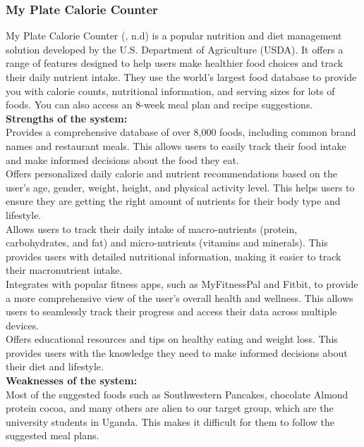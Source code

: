 \documentclass {article}
\begin{document}
\subsubsection{My Plate Calorie Counter}

\noindent My Plate Calorie Counter (, n.d) is a popular nutrition and diet management solution developed by the U.S. Department of Agriculture (USDA). It offers a range of features designed to help users make healthier food choices and track their daily nutrient intake. They use the world’s largest food database to provide you with calorie counts, nutritional information, and serving sizes for lots of foods. You can also access an 8-week meal plan and recipe suggestions.\\

\noindent \textbf{Strengths of the system:\\}
\noindent Provides a comprehensive database of over 8,000 foods, including common brand names and restaurant meals. This allows users to easily track their food intake and make informed decisions about the food they eat.\\

\noindent Offers personalized daily calorie and nutrient recommendations based on the user’s age, gender, weight, height, and physical activity level. This helps users to ensure they are getting the right amount of nutrients for their body type and lifestyle.\\

\noindent Allows users to track their daily intake of macro-nutrients (protein, carbohydrates, and fat) and micro-nutrients (vitamins and minerals). This provides users with detailed nutritional information, making it easier to track their macronutrient intake.\\

\noindent Integrates with popular fitness apps, such as MyFitnessPal and Fitbit, to provide a more comprehensive view of the user’s overall health and wellness. This allows users to seamlessly track their progress and access their data across multiple devices.\\

\noindent Offers educational resources and tips on healthy eating and weight loss. This provides users with the knowledge they need to make informed decisions about their diet and lifestyle.\\

\noindent \textbf{Weaknesses of the system: \\}
\noindent Most of the suggested foods such as Southwestern Pancakes, chocolate Almond protein cocoa, and many others are alien to our target group, which are the university students in Uganda. This makes it difficult for them to follow the suggested meal plans.\\
\end{document}
